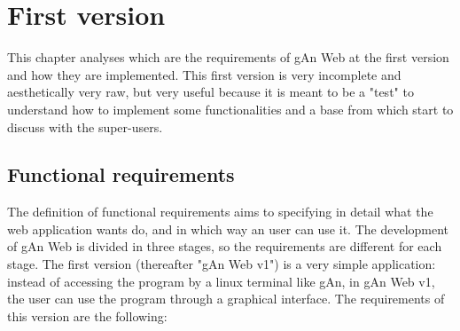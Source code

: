 
\chapter{First version} %

\label{Chapter4} %


This chapter analyses which are the requirements of gAn Web at the first version and how they are implemented. This first version is very incomplete and aesthetically very raw, but very useful because it is meant to be a "test" to understand how to implement some functionalities and a base from which start to discuss with the super-users. 

\section{Functional requirements}
The definition of functional requirements aims to specifying in detail what the web application wants do, and in which way an user can use it. The development of gAn Web is divided in three stages, so the requirements are different for each stage. The first version (thereafter "gAn Web v1") is a very simple application: instead of accessing the program by a linux terminal like gAn, in gAn Web v1, the user can use the program through a graphical interface. 
The requirements of this version are the following:

